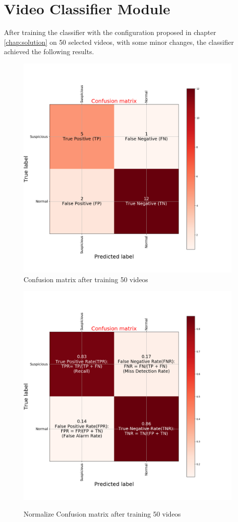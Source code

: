 \section{Video Classifier Module}
After training the classifier with the configuration proposed in chapter \ref{chap:solution} on 50 selected videos, with some minor changes, the classifier achieved the following results. 
	\begin{figure}[H]
	\centering
	\includegraphics[width=1\columnwidth]{images/chap5/confusion_matrix_detail.png}
	\caption{Confusion matrix after training 50 videos}
\end{figure}
\begin{figure}[H]
	\centering
	\includegraphics[width=1\columnwidth]{images/chap5/normalize_confusion_matrix_detail.png}
	\label{chap5:Norm-CFM}
	\caption{Normalize Confusion matrix after training 50 videos}
\end{figure}
